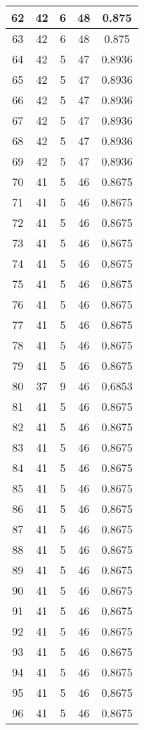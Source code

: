 \documentclass[letterpaper, 12pt]{article}
\begin{document}
\begin{longtable}{|c|c|c|c|c|}
\hline
62 & 42 & 6 & 48 & 0.875 \\
\hline
63 & 42 & 6 & 48 & 0.875 \\
\hline
64 & 42 & 5 & 47 & 0.8936 \\
\hline
65 & 42 & 5 & 47 & 0.8936 \\
\hline
66 & 42 & 5 & 47 & 0.8936 \\
\hline
67 & 42 & 5 & 47 & 0.8936 \\
\hline
68 & 42 & 5 & 47 & 0.8936 \\
\hline
69 & 42 & 5 & 47 & 0.8936 \\
\hline
70 & 41 & 5 & 46 & 0.8675 \\
\hline
71 & 41 & 5 & 46 & 0.8675 \\
\hline
72 & 41 & 5 & 46 & 0.8675 \\
\hline
73 & 41 & 5 & 46 & 0.8675 \\
\hline
74 & 41 & 5 & 46 & 0.8675 \\
\hline
75 & 41 & 5 & 46 & 0.8675 \\
\hline
76 & 41 & 5 & 46 & 0.8675 \\
\hline
77 & 41 & 5 & 46 & 0.8675 \\
\hline
78 & 41 & 5 & 46 & 0.8675 \\
\hline
79 & 41 & 5 & 46 & 0.8675 \\
\hline
80 & 37 & 9 & 46 & 0.6853 \\
\hline
81 & 41 & 5 & 46 & 0.8675 \\
\hline
82 & 41 & 5 & 46 & 0.8675 \\
\hline
83 & 41 & 5 & 46 & 0.8675 \\
\hline
84 & 41 & 5 & 46 & 0.8675 \\
\hline
85 & 41 & 5 & 46 & 0.8675 \\
\hline
86 & 41 & 5 & 46 & 0.8675 \\
\hline
87 & 41 & 5 & 46 & 0.8675 \\
\hline
88 & 41 & 5 & 46 & 0.8675 \\
\hline
89 & 41 & 5 & 46 & 0.8675 \\
\hline
90 & 41 & 5 & 46 & 0.8675 \\
\hline
91 & 41 & 5 & 46 & 0.8675 \\
\hline
92 & 41 & 5 & 46 & 0.8675 \\
\hline
93 & 41 & 5 & 46 & 0.8675 \\
\hline
94 & 41 & 5 & 46 & 0.8675 \\
\hline
95 & 41 & 5 & 46 & 0.8675 \\
\hline
96 & 41 & 5 & 46 & 0.8675 \\

\end{longtable}
\end{document}
